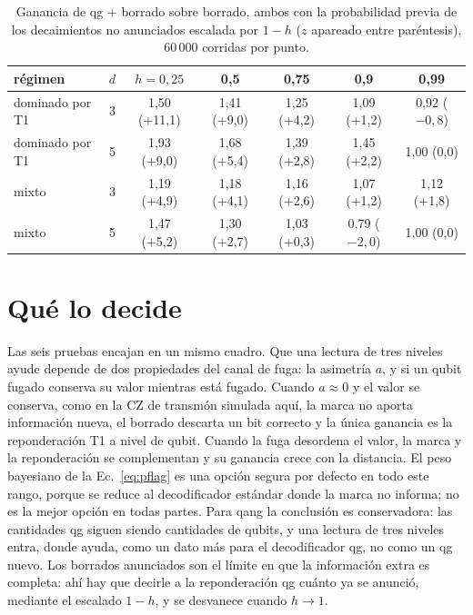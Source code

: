 \documentclass[11pt]{article}
\begin{document}
\begin{table}[t]
\centering\small
\caption{Ganancia de qg + borrado sobre borrado, ambos con la probabilidad previa de los decaimientos
no anunciados escalada por $1-h$ ($z$ apareado entre paréntesis), 60\,000 corridas por punto.}
\label{tab:erasure}
\setlength{\tabcolsep}{3.5pt}
\begin{tabular}{lcccccc}
\toprule
régimen & $d$ & $h=0{,}25$ & 0{,}5 & 0{,}75 & 0{,}9 & 0{,}99\\
\midrule
dominado por T1 & 3 & 1{,}50 (+11{,}1) & 1{,}41 (+9{,}0) & 1{,}25 (+4{,}2) & 1{,}09 (+1{,}2) & 0{,}92 ($-0{,}8$)\\
dominado por T1 & 5 & 1{,}93 (+9{,}0) & 1{,}68 (+5{,}4) & 1{,}39 (+2{,}8) & 1{,}45 (+2{,}2) & 1{,}00 (0{,}0)\\
mixto & 3 & 1{,}19 (+4{,}9) & 1{,}18 (+4{,}1) & 1{,}16 (+2{,}6) & 1{,}07 (+1{,}2) & 1{,}12 (+1{,}8)\\
mixto & 5 & 1{,}47 (+5{,}2) & 1{,}30 (+2{,}7) & 1{,}03 (+0{,}3) & 0{,}79 ($-2{,}0$) & 1{,}00 (0{,}0)\\
\bottomrule
\end{tabular}
\end{table}

\section{Qué lo decide}

Las seis pruebas encajan en un mismo cuadro. Que una lectura de tres niveles ayude depende de dos
propiedades del canal de fuga: la asimetría $a$, y si un qubit fugado conserva su valor mientras está
fugado. Cuando $a\approx0$ y el valor se conserva, como en la CZ de transmón simulada aquí, la marca no
aporta información nueva, el borrado descarta un bit correcto y la única ganancia es la reponderación
T1 a nivel de qubit. Cuando la fuga desordena el valor, la marca y la reponderación se complementan y
su ganancia crece con la distancia. El peso bayesiano de la Ec.~\eqref{eq:pflag} es una opción segura
por defecto en todo este rango, porque se reduce al decodificador estándar donde la marca no informa;
no es la mejor opción en todas partes. Para qang la conclusión es conservadora: las cantidades qg
siguen siendo cantidades de qubits, y una lectura de tres niveles entra, donde ayuda, como un dato más
para el decodificador qg, no como un qg nuevo. Los borrados anunciados son el límite en que la
información extra es completa: ahí hay que decirle a la reponderación qg cuánto ya se anunció, mediante
el escalado $1-h$, y se desvanece cuando $h\to1$.
\end{document}
